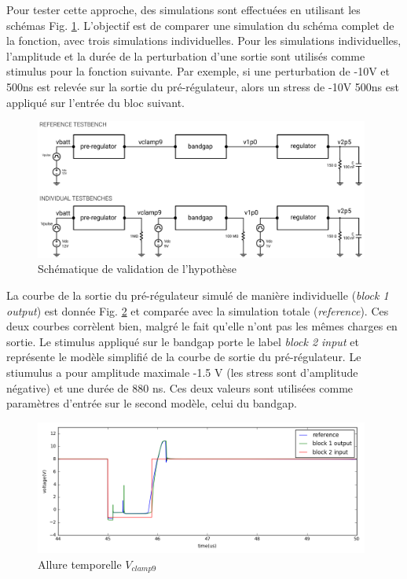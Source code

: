 Pour tester cette approche, des simulations sont effectuées en utilisant les schémas Fig. \ref{fig:hypothesis-setup}.
L'objectif est de comparer une simulation du schéma complet de la fonction, avec trois simulations individuelles.
Pour les simulations individuelles, l'amplitude et la durée de la perturbation d'une sortie sont utilisés comme stimulus pour la fonction suivante.
Par exemple, si une perturbation de -10V et 500ns est relevée sur la sortie du pré-régulateur, alors un stress de -10V 500ns est appliqué sur l'entrée du bloc suivant.

\begin{figure}[!h]
  \centering
  \includegraphics[width=0.98\textwidth]{src/1/figures/hypothesis_testing_setup.pdf}
  \caption{Schématique de validation de l'hypothèse}
  \label{fig:hypothesis-setup}
\end{figure}

La courbe de la sortie du pré-régulateur simulé de manière individuelle (\textit{block 1 output}) est donnée Fig. \ref{fig:sim-compare-block1} et comparée avec la simulation totale (\textit{reference}).
Ces deux courbes corrèlent bien, malgré le fait qu'elle n'ont pas les mêmes charges en sortie.
Le stimulus appliqué sur le bandgap porte le label \textit{block 2 input} et représente le modèle simplifié de la courbe de sortie du pré-régulateur.
Le stiumulus a pour amplitude maximale -1.5 V (les stress sont d'amplitude négative) et une durée de 880 ns.
Ces deux valeurs sont utilisées comme paramètres d'entrée sur le second modèle, celui du bandgap.

\begin{figure}[!h]
  \centering
  \includegraphics[width=0.98\textwidth]{src/1/figures/simulation_comparison_block1.png}
  \caption{Allure temporelle $V_{clamp9}$}
  \label{fig:sim-compare-block1}
\end{figure}


